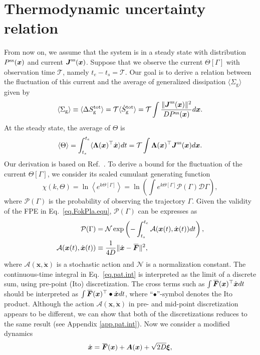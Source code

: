 \documentclass[pre,
twocolumn,
]{revtex4-1}
\newcommand{\overbar}[1]{\mkern 1.5mu\overline{\mkern-1.5mu#1\mkern-1.5mu}\mkern 1.5mu}
\theoremstyle{definition}
\theoremstyle{definition}
\newcommand{\bol}{\boldsymbol}
\newcommand{\mca}{\mathcal}
\newcommand{\mrm}{\mathrm}
\newcommand{\eq}[1]{\begin{equation}#1\end{equation}}
\newcommand{\al}[1]{\begin{align}#1\end{align}}
\newcommand{\avg}[1]{\langle #1\rangle}
\newcommand{\avgl}[1]{\left\langle #1\right\rangle}
\newcommand{\inl}[1]{$ #1 $}
\newcommand{\bra}[1]{\left( #1 \right)}
\newcommand{\norm}[1]{\Vert #1 \Vert}
\begin{document}
\section{Thermodynamic uncertainty relation}
From now on, we assume that the system is in a steady state with distribution \inl{P^{\rm ss}(\bol{x})} and current \inl{\bol{J}^{\rm ss}(\bol{x})}.
Suppose that we observe the current \inl{\Theta[\Gamma]} with observation time \inl{\mca{T}}, namely \inl{t_e-t_s=\mca{T}}.
Our goal is to derive a relation between the fluctuation of this current and the average of generalized dissipation \inl{\avg{\Sigma_{\mrm{g}}}} given by
\eq{
\avg{\Sigma_{\mrm{g}}}\equiv\avg{\Delta S_{\rm g}^{\rm tot}}=\mca{T}\avg{\dot{S}_{\rm g}^{\rm tot}}=\mca{T}\int\frac{\norm{\bol{J}^{\rm ss}(\bol{x})}^2}{DP^{\rm ss}(\bol{x})}d\bol{x}.\label{eq.gen.dis.def}
}
At the steady state, the average of \inl{\Theta} is 
\eq{
\avg{\Theta}=\int_{t_s}^{t_e}\avg{\bol{\Lambda}(\bol{x})^\top\dot{\bol{x}}}dt=\mca{T}\int\bol{\Lambda}(\bol{x})^\top\bol{J}^{\rm ss}(\bol{x})d\bol{x}.
}
Our derivation is based on Ref.~\cite{Andreas.2018.JSM}.
To derive a bound for the fluctuation of the current \inl{\Theta[\Gamma]}, we consider its scaled cumulant generating function
\eq{
\chi(k,\Theta)=\ln{\avgl{e^{k\Theta[\Gamma]}}}=\ln\bra{\int e^{k\Theta[\Gamma]}\mca{P}(\Gamma)\mca{D}\Gamma},\label{eq.gen.fun.def}
}
where \inl{\mca{P}(\Gamma)} is the probability of observing the trajectory \inl{\Gamma}.
Given the validity of the FPE in Eq.~\eqref{eq.FokPla.equ}, \inl{\mca{P}(\Gamma)} can be expresses as \cite{Risken.1989}
\al{
\mca{P}(\Gamma)&=\mca{N}\exp\bra{-\int_{t_s}^{t_e}\mca{A}(\bol{x}(t),\dot{\bol{x}}(t))dt},\label{eq.pat.int}\\
\mca{A}(\bol{x}(t),\dot{\bol{x}}(t))&\equiv\frac{1}{4D}\norm{\dot{\bol{x}}-\overbar{\bol{F}}}^2,
}
where \inl{\mca{A}(\bol{x},\dot{\bol{x}})} is a stochastic action and \inl{\mca{N}} is a normalization constant.
The continuous-time integral in Eq.~\eqref{eq.pat.int} is interpreted as the limit of a discrete sum, using pre-point (Ito) discretization.
The cross terms such as \inl{\int\overbar{\bol{F}}(\bol{x})^\top\dot{\bol{x}}dt} should be interpreted as \inl{\int\overbar{\bol{F}}(\bol{x})^\top\bullet\dot{\bol{x}}dt}, where ``\inl{\bullet}''-symbol denotes the Ito product.
Although the action \inl{\mca{A}(\bol{x},\dot{\bol{x}})} in pre- and mid-point discretization appears to be different, we can show that both of the discretizations reduces to the same result (see Appendix \ref{app.pat.int}).
Now we consider a modified dynamics
\eq{
\dot{\bol{x}}=\overbar{\bol{F}}(\bol{x})+\bol{A}(\bol{x})+\sqrt{2D}\bol{\xi},
}
\end{document}
